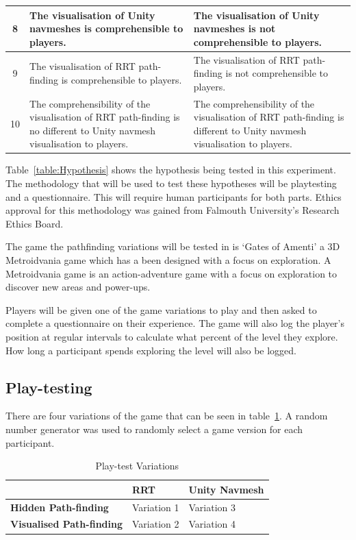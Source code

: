 \documentclass[journal]{IEEEtran}
\begin{document}
\begin{table}[h]
\begin{tabular}{|c|p{7.5cm}|p{7.5cm}|}
			8 &   The visualisation of  Unity navmeshes is comprehensible to players.
			&  The visualisation of  Unity navmeshes is not comprehensible to players.
			\\ \hline
			
			9 &  The visualisation of  RRT path-finding is comprehensible to players.
			&  The visualisation of  RRT path-finding is not comprehensible to players.
			\\ \hline
			
			10 &  The comprehensibility of the visualisation of RRT path-finding is no different to Unity navmesh visualisation to players.
			&  The comprehensibility of the visualisation of RRT path-finding is different to Unity navmesh visualisation to players.
			\\ \hline
		\end{tabular}
	\end{table}
	Table~\ref{table:Hypothesis} shows the hypothesis being tested in this experiment. The methodology that will be used to test these hypotheses will be playtesting and a questionnaire. This will require human participants for both parts. Ethics approval for this methodology was gained from Falmouth University’s Research Ethics Board.
	
	The game the pathfinding variations will be tested in is `Gates of Amenti' a 3D Metroidvania game which has a been designed with a focus on exploration. A Metroidvania game is an action-adventure game with a focus on exploration to discover new areas and power-ups.
	
	Players will be given one of the game variations to play and then asked to complete a questionnaire on their experience. The game will also log the player's position at regular intervals to calculate what percent of the level they explore. How long a participant spends exploring the level will also be logged.
	
	\subsection{Play-testing}
	There are four variations of the game that can be seen in table~\ref{table:PlaytestVariations}.  A random number generator was used to randomly select a game version for each participant.
	
	\begin{table}[H]
		\centering
		\caption{Play-test Variations}
		\label{table:PlaytestVariations}
		\def\arraystretch{1.5}
		\begin{tabular}{ |l|l|l|}
			\hline
			& \textbf{RRT}& \textbf{Unity Navmesh} \\
			\hline
			\textbf{Hidden Path-finding}    & Variation 1            & Variation 3 \\
			\hline
			\textbf{Visualised Path-finding}& Variation 2              & Variation 4 \\
			\hline
		\end{tabular}
	\end{table}
	
\end{document}
